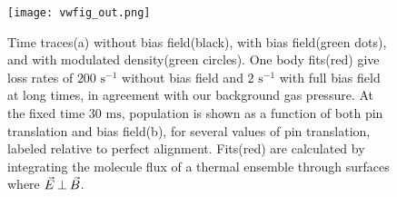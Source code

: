 \documentclass[%
 reprint,
 amsmath,amssymb,
 aps,
prl,
]{revtex4-1}
\newcommand{\bcl}{{$B_\text{coil}$}}
\newcommand{\epb}{{$\vec{E}\s {\perp}\s\vec{B}$}}
\newcommand{\s}{{\nobreak\hspace{.2em}}}
\begin{document}
%


\begin{figure}[tb]
\texttt{[image: vwfig\_out.png]}%
\caption{
Time traces\s(a) without bias field\s(black), with bias field\s(green dots), and with modulated density\s(green circles). 
One body fits\s(red) give loss rates of $200\text{ s}^{-1}$ without bias field and $2\text{ s}^{-1}$ with full bias field at long times, in agreement with our background gas pressure. 
At the fixed time $30\text{ ms}$, population is shown as a function of both pin translation and bias field\s(b), for several values of pin translation, labeled relative to perfect alignment. 
Fits\s(red) are calculated by integrating the molecule flux of a thermal ensemble through surfaces where \epb.
\label{fig:WVplot}}
\end{figure}
\end{document}
